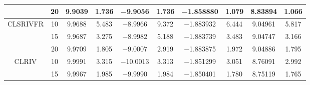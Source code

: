 \documentclass{style/presentation}
\begin{document}
\begin{frame}
\begin{table}[!htbp]
\begin{center}
\begin{tabular}{cccccccccc}
                                                            & \num{20} & \num{9.9039}                        & \num{1.736}                            & \num{-9.9056}                       & \num{1.736}                            & \num{-1.858880}                    & \num{1.079}                            & \num{8.83894}                       & \num{1.066}                            \\
                \hline
                \multirow{3}{*}{CLSRIVFR}                   & \num{10} & \num{9.9688}                        & \num{5.483}                            & \num{-8.9966}                       & \num{9.372}                            & \num{-1.883932}                    & \num{6.444}                            & \num{9.04961}                       & \num{5.817}                            \\
                                                            & \num{15} & \num{9.9687}                        & \num{3.275}                            & \num{-8.9982}                       & \num{5.188}                            & \num{-1.883739}                    & \num{3.483}                            & \num{9.04747}                       & \num{3.166}                            \\
                                                            & \num{20} & \num{9.9709}                        & \num{1.805}                            & \num{-9.0007}                       & \num{2.919}                            & \num{-1.883875}                    & \num{1.972}                            & \num{9.04886}                       & \num{1.795}                            \\
                \hline
                \multirow{3}{*}{CLRIV}                      & \num{10} & \num{9.9991}                        & \num{3.315}                            & \num{-10.0013}                      & \num{3.313}                            & \num{-1.851299}                    & \num{3.051}                            & \num{8.76091}                       & \num{2.992}                            \\
                                                            & \num{15} & \num{9.9967}                        & \num{1.985}                            & \num{-9.9990}                       & \num{1.984}                            & \num{-1.850401}                    & \num{1.780}                            & \num{8.75119}                       & \num{1.765}                            \\

\end{tabular}
\end{center}
\end{table}
\end{frame}
\end{document}
